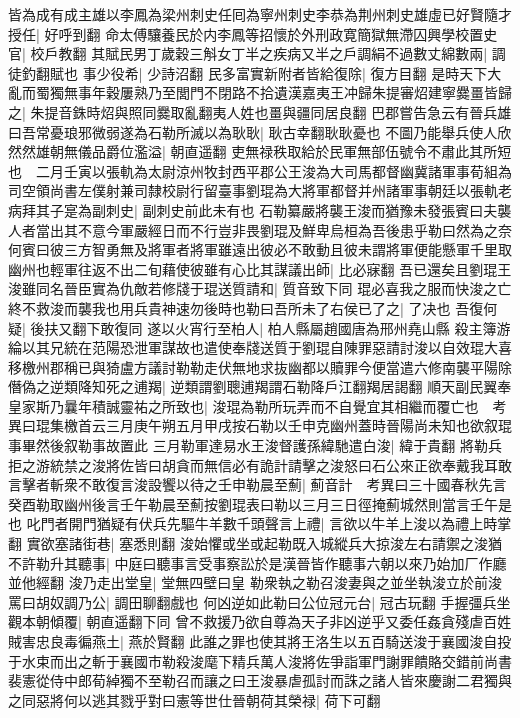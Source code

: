 皆為成有成主雄以李鳳為梁州刺史任囘為寧州刺史李恭為荆州刺史雄虛已好賢隨才授任|{
	好呼到翻}
命太傅驤養民於内李鳳等招懷於外刑政寛簡獄無滯囚興學校置史官|{
	校戶教翻}
其賦民男丁歲穀三斛女丁半之疾病又半之戶調絹不過數丈綿數兩|{
	調徒釣翻賦也}
事少役希|{
	少詩沼翻}
民多富實新附者皆給復除|{
	復方目翻}
是時天下大亂而蜀獨無事年穀屢熟乃至閭門不閉路不拾遺漢嘉夷王冲歸朱提審炤建寧爨畺皆歸之|{
	朱提音銖時炤與照同爨取亂翻夷人姓也畺與疆同居良翻}
巴郡嘗告急云有晉兵雄曰吾常憂琅邪微弱遂為石勒所滅以為耿耿|{
	耿古幸翻耿耿憂也}
不圖乃能舉兵使人欣然然雄朝無儀品爵位濫溢|{
	朝直遥翻}
吏無禄秩取給於民軍無部伍號令不肅此其所短也　二月壬寅以張軌為太尉涼州牧封西平郡公王浚為大司馬都督幽冀諸軍事荀組為司空領尚書左僕射兼司隸校尉行留臺事劉琨為大將軍都督并州諸軍事朝廷以張軌老病拜其子寔為副刺史|{
	副刺史前此未有也}
石勒纂嚴將襲王浚而猶豫未發張賓曰夫襲人者當出其不意今軍嚴經日而不行豈非畏劉琨及鮮卑烏桓為吾後患乎勒曰然為之奈何賓曰彼三方智勇無及將軍者將軍雖遠出彼必不敢動且彼未謂將軍便能懸軍千里取幽州也輕軍往返不出二旬藉使彼雖有心比其謀議出師|{
	比必寐翻}
吾已還矣且劉琨王浚雖同名晉臣實為仇敵若修牋于琨送質請和|{
	質音致下同}
琨必喜我之服而快浚之亡終不救浚而襲我也用兵貴神速勿後時也勒曰吾所未了右侯已了之|{
	了决也}
吾復何疑|{
	後扶又翻下敢復同}
遂以火宵行至柏人|{
	柏人縣屬趙國唐為邢州堯山縣}
殺主簿游綸以其兄統在范陽恐泄軍謀故也遣使奉牋送質于劉琨自陳罪惡請討浚以自效琨大喜移檄州郡稱已與猗盧方議討勒勒走伏無地求抜幽都以贖罪今便當遣六修南襲平陽除僭偽之逆類降知死之逋羯|{
	逆類謂劉聰逋羯謂石勒降戶江翻羯居謁翻}
順天副民翼奉皇家斯乃曩年積誠靈祐之所致也|{
	浚琨為勒所玩弄而不自覺宜其相繼而覆亡也　考異曰琨集檄首云三月庚午朔五月甲戌按石勒以壬申克幽州蓋時晉陽尚未知也欲叙琨事畢然後叙勒事故置此}
三月勒軍達易水王浚督護孫緯馳遣白浚|{
	緯于貴翻}
將勒兵拒之游統禁之浚將佐皆曰胡貪而無信必有詭計請擊之浚怒曰石公來正欲奉戴我耳敢言擊者斬衆不敢復言浚設饗以待之壬申勒晨至薊|{
	薊音計　考異曰三十國春秋先言癸酉勒取幽州後言壬午勒晨至薊按劉琨表曰勒以三月三日徑掩薊城然則當言壬午是也}
叱門者開門猶疑有伏兵先驅牛羊數千頭聲言上禮|{
	言欲以牛羊上浚以為禮上時掌翻}
實欲塞諸街巷|{
	塞悉則翻}
浚始懼或坐或起勒既入城縱兵大掠浚左右請禦之浚猶不許勒升其聽事|{
	中庭曰聽事言受事察訟於是漢晉皆作聽事六朝以來乃始加厂作廳並他經翻}
浚乃走出堂皇|{
	堂無四壁曰皇}
勒衆執之勒召浚妻與之並坐執浚立於前浚罵曰胡奴調乃公|{
	調田聊翻戲也}
何凶逆如此勒曰公位冠元台|{
	冠古玩翻}
手握彊兵坐觀本朝傾覆|{
	朝直遥翻下同}
曾不救援乃欲自尊為天子非凶逆乎又委任姦貪殘虐百姓賊害忠良毒徧燕土|{
	燕於賢翻}
此誰之罪也使其將王洛生以五百騎送浚于襄國浚自投于水束而出之斬于襄國市勒殺浚麾下精兵萬人浚將佐爭詣軍門謝罪饋賂交錯前尚書裴憲從侍中郎荀綽獨不至勒召而讓之曰王浚暴虐孤討而誅之諸人皆來慶謝二君獨與之同惡將何以逃其戮乎對曰憲等世仕晉朝荷其榮禄|{
	荷下可翻}
